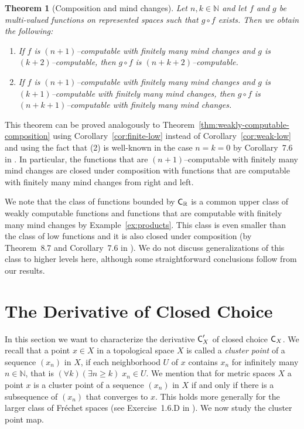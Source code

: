\documentclass[a4paper]{amsart}
\def\IN{{\mathbb{N}}}
\def\IR{{\mathbb{R}}}
\def\C{\mbox{\rm\sffamily C}}
\newtheorem{theorem}{Theorem}[section]
\theoremstyle{definition}
\begin{document}
\begin{theorem}[Composition and mind changes]
\label{thm:mind-changes-composition}
Let $n,k\in\IN$ and let $f$ and $g$ be multi-valued functions on represented spaces
such that $g\circ f$ exists. Then we obtain the following:
\begin{enumerate}
\item If $f$ is $(n+1)$--computable with finitely many mind changes and $g$ is $(k+2)$--computable, then 
         $g\circ f$ is $(n+k+2)$--computable. 
\item If $f$ is $(n+1)$--computable with finitely many mind changes and $g$ is $(k+1)$--computable with
        finitely many mind changes, then $g\circ f$ is $(n+k+1)$--computable with finitely many mind changes.
\end{enumerate}
\end{theorem}

This theorem can be proved analogously to Theorem~\ref{thm:weakly-computable-composition} using Corollary~\ref{cor:finite-low}
instead of Corollary~\ref{cor:weak-low} and using the fact that (2) is well-known in the case $n=k=0$ by Corollary~7.6 in \cite{BBP}.
In particular, the functions that are $(n+1)$--computable with finitely many mind changes are closed under composition with 
functions that are computable with finitely many mind changes from right and left.

We note that the class of functions bounded by $\C_\IR$ is a common upper class of weakly computable
functions and functions that are computable with finitely many mind changes by Example~\ref{ex:products}.
This class is even smaller than the class of low functions and it is also closed under composition (by Theorem~8.7 and Corollary~7.6 in \cite{BBP}).
We do not discuss generalizations of this class to higher levels here, although some straightforward
conclusions follow from our results.


\section{The Derivative of Closed Choice}

In this section we want to characterize the derivative $\C_X'$ of closed choice $\C_X$.
We recall that a point $x\in X$ in a topological space $X$ is called 
a {\em cluster point} of a sequence $(x_n)$ in $X$, if each neighborhood
$U$ of $x$ contains $x_n$ for infinitely many $n\in\IN$, that is
$(\forall k)(\exists n\geq k)\;x_n\in U$. 
We mention that for metric spaces $X$ a point $x$ is a cluster point of a sequence $(x_n)$ in $X$
if and only if there is a subsequence of $(x_n)$ that converges to $x$. This holds more generally
for the larger class of Fr\'echet spaces (see Exercise~1.6.D in \cite{Eng89}).
We now study the cluster point map.
\end{document}
